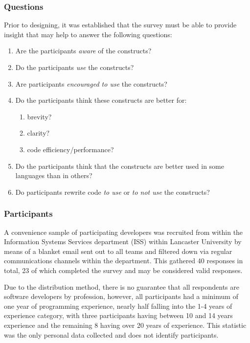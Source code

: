 \documentclass{article}
\begin{document}
        \subsubsection{Questions}
        \label{subsubsec:surveyQuestions}
            Prior to designing, it was established that the survey must be able to provide insight that may help to answer the following questions:
            \begin{enumerate}
                \item Are the participants \emph{aware} of the constructs?
                \item Do the participants \emph{use} the constructs?
                \item Are participants \emph{encouraged to use} the constructs?
                \item Do the participants think these constructs are better for:
                \begin{enumerate}
                    \item brevity?
                    \item clarity?
                    \item code efficiency/performance?
                \end{enumerate}  
                \item Do the participants think that the constructs are better used in some languages than in others?
                \item Do participants rewrite code \emph{to use} or \emph{to not use} the constructs?
            \end{enumerate}
            
        \subsubsection{Participants}
            A convenience sample of participating developers was recruited from within the Information Systems Services department (ISS) within Lancaster University by means of a blanket email sent out to all teams and filtered down via regular communications channels within the department. This gathered 40 responses in total, 23 of which completed the survey and may be considered valid responses.
            
            Due to the distribution method, there is no guarantee that all respondents are software developers by profession, however, all participants had a minimum of one year of programming experience, nearly half falling into the 1-4 years of experience category, with three participants having between 10 and 14 years experience and the remaining 8 having over 20 years of experience. This statistic was the only personal data collected and does not identify participants.
\end{document}
